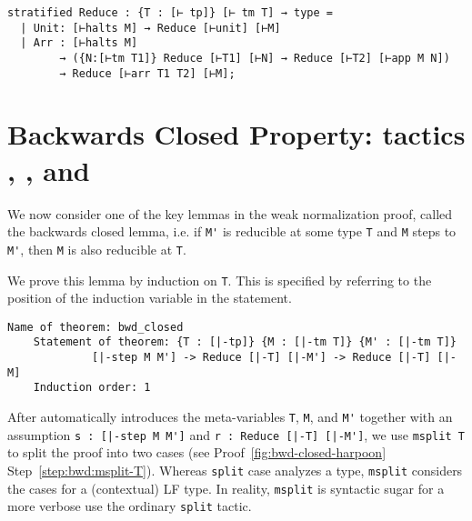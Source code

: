 \begin{lstlisting}
stratified Reduce : {T : [⊢ tp]} [⊢ tm T] → type =
  | Unit: [⊢halts M] → Reduce [⊢unit] [⊢M]
  | Arr : [⊢halts M]
        → ({N:[⊢tm T1]} Reduce [⊢T1] [⊢N] → Reduce [⊢T2] [⊢app M N])
        → Reduce [⊢arr T1 T2] [⊢M];
\end{lstlisting}

\section{%
  Backwards Closed Property: tactics \ttmsplit, \ttsuffices, and \ttby%
}

We now consider one of the key lemmas in the weak normalization proof,
called the backwards closed lemma, i.e.  if \lstinline!M'! is
reducible at some type \lstinline!T! and \lstinline!M! steps to
\lstinline!M'!, then \lstinline!M! is also reducible at \lstinline!T!.

We prove this lemma by induction on \lstinline!T!. This is
specified by referring to the position of the induction variable in
the statement.

\begin{lstlisting}[gobble=2, deletekeywords={of}]
    Name of theorem: bwd_closed
    Statement of theorem: {T : [|-tp]} {M : [|-tm T]} {M' : [|-tm T]}
             [|-step M M'] -> Reduce [|-T] [|-M'] -> Reduce [|-T] [|-M]
    Induction order: 1
\end{lstlisting}

%
After \Harpoon{} automatically
introduces the meta-variables \lstinline!T!, \lstinline!M!,
and \lstinline!M'! together with an assumption
\lstinline!s : [|-step M M']! and \lstinline!r : Reduce [|-T] [|-M']!,
we use \lstinline!msplit T! to split the proof into two cases (see
\Harpoon{} Proof~\ref{fig:bwd-closed-harpoon}
Step~\ref{step:bwd:msplit-T}). Whereas \lstinline!split! case analyzes
a \Beluga{} type, \lstinline!msplit! considers the cases for a
(contextual) LF type. In reality, \lstinline!msplit! is syntactic sugar for a
more verbose use the ordinary \lstinline!split! tactic.


